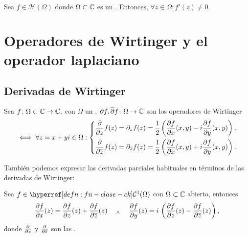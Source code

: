 \begin{lem}\label{lem:localmente-inyectiva-implica-inversa-no-nula}
    Sea $f \in \mathcal{H}(\Omega)$  donde $\Omega \subset \mathbb{C}$ es un . Entonces, $\forall z \in \Omega : f'(z) \neq 0$.
\end{lem}

\cleardoublepage

\section{Operadores de Wirtinger y el operador laplaciano}

\subsection{Derivadas de Wirtinger}

\begin{defn}\label{defn:operadores-wirtinger}
    Sea $f \colon \Omega \subset \mathbb{C} \to \mathbb{C}$, con $\Omega$ un , $\partial f, \overline{\partial}f \colon \Omega \to \mathbb{C}$ son los operadores de Wirtinger
    \[
        \iff \forall z = x+yi \in \Omega : \left\{\begin{aligned}
            \pdv{}{z} f (z) &= \partial_z f (z)=  \frac{1}{2} \left(\pdv{f}{x}(x, y) - i\pdv{f}{y}(x, y)\right), \\
            \pdv{}{\overline{z}} f (z) &= \partial_{\overline{z}} f (z)=  \frac{1}{2} \left(\pdv{f}{x}(x, y) + i\pdv{f}{y}(x, y)\right).
        \end{aligned}\right.
    \] 
\end{defn}

También podemos expresar las derivadas parciales habituales en términos de las derivadas de Wirtinger:

\begin{lem}\label{lem:derivadas-parciales-wirtinger}
    Sea $f \in \exhyperref[defn:fn-clase-ck]{fn-clase-ck}{\mathcal{C}^1}(\Omega)$ con $\Omega \subset \mathbb{C}$ abierto, entonces
    \[
    \pdv{f}{x}(z) = \pdv{f}{z}(z) + \pdv{f}{\overline{z}}(z) \quad \; _{\wedge} \; \quad \pdv{f}{y}(z) = i \, \left(\pdv{f}{z}(z) - \pdv{f}{\overline{z}}(z)\right),
    \]
    donde $\pdv{}{z}$ y $\pdv{}{\overline{z}}$ son las .
\end{lem}

